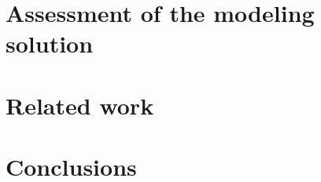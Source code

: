\documentclass[american]{emisa}
\begin{document}
\begin{article}
\section{Assessment of the modeling solution}
\label{sec:discussion}


\section{Related work}
\label{sec:relatedwork}


\section{Conclusions}
\label{sec:conclusions}


\printbibliography

\end{article}
\end{document}
